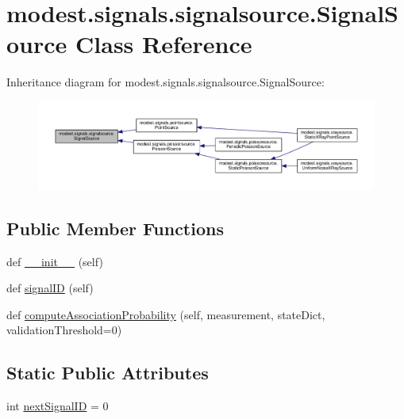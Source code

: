 \hypertarget{classmodest_1_1signals_1_1signalsource_1_1SignalSource}{}\section{modest.\+signals.\+signalsource.\+Signal\+Source Class Reference}
\label{classmodest_1_1signals_1_1signalsource_1_1SignalSource}


Inheritance diagram for modest.\+signals.\+signalsource.\+Signal\+Source\+:\nopagebreak
\begin{figure}[H]
\begin{center}
\leavevmode
\includegraphics[width=350pt]{classmodest_1_1signals_1_1signalsource_1_1SignalSource__inherit__graph}
\end{center}
\end{figure}
\subsection*{Public Member Functions}
\begin{DoxyCompactItemize}
\item 
def \hyperlink{classmodest_1_1signals_1_1signalsource_1_1SignalSource_abc71be8fa60c2431ee68d4b7752684f0}{\+\_\+\+\_\+init\+\_\+\+\_\+} (self)
\item 
def \hyperlink{classmodest_1_1signals_1_1signalsource_1_1SignalSource_a9a64c6a9c2954f6ad61e4ca3518ea8ab}{signal\+ID} (self)
\item 
def \hyperlink{classmodest_1_1signals_1_1signalsource_1_1SignalSource_a3d32dbed840ea9ac775b226f0a654831}{compute\+Association\+Probability} (self, measurement, state\+Dict, validation\+Threshold=0)
\end{DoxyCompactItemize}
\subsection*{Static Public Attributes}
\begin{DoxyCompactItemize}
\item 
int \hyperlink{classmodest_1_1signals_1_1signalsource_1_1SignalSource_a453eafb550b551adbec0903deb63dfce}{next\+Signal\+ID} = 0
\end{DoxyCompactItemize}
